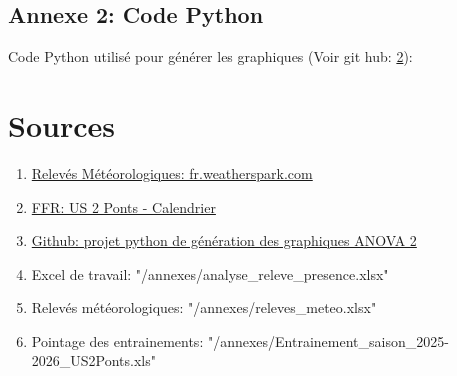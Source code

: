 \documentclass[12pt, a4paper,french]{report}
\begin{document}
  \section{Annexe 2: Code Python}\label{annexe2}
  Code Python utilisé pour générer les graphiques (Voir git hub: \ref{sources}): 
  

\chapter{Sources}\label{sources}
  \begin{enumerate}
    \item \href{https://fr.weatherspark.com/h/m/51913/2025/8/M\%C3\%A9t\%C3\%A9o-historique-en-ao\%C3\%BBt-2025-\%C3\%A0-Grenoble-France}{Relevés Météorologiques: fr.weatherspark.com}
    \item \href{https://monclubhouse.ffr.fr/clubs/u-s-deux-ponts/competitions/auvergne-rhone-alpes-regionale-1-championnat-territorial/qualification-44337/calendrier-resultats}{FFR: US 2 Ponts - Calendrier}
    \item \href{https://github.com/egohory/plan-experience}{Github: projet python de génération des graphiques ANOVA 2}
    \item Excel de travail: "/annexes/analyse\_releve\_presence.xlsx"
    \item Relevés météorologiques: "/annexes/releves\_meteo.xlsx"
    \item Pointage des entrainements: "/annexes/Entrainement\_saison\_2025-2026\_US2Ponts.xls"
  \end{enumerate}
\end{document}
